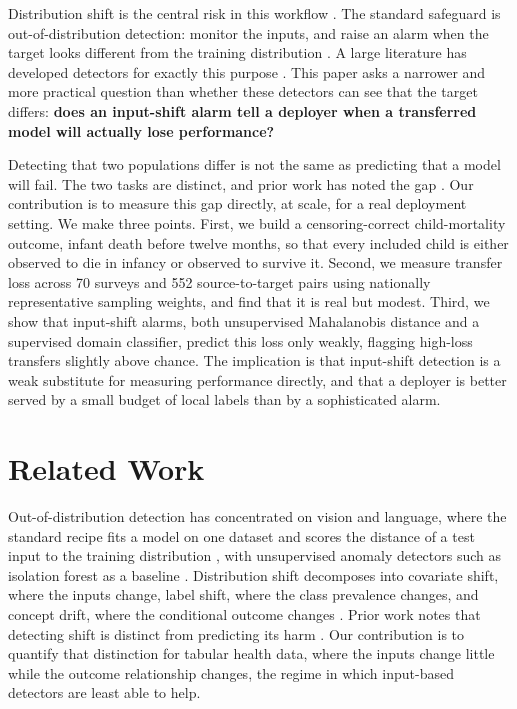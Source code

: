 \documentclass[letterpaper]{article} %
\begin{document}
Distribution shift is the central risk in this workflow \citep{quionero2009dataset, koh2021wilds}. The standard safeguard is out-of-distribution detection: monitor the inputs, and raise an alarm when the target looks different from the training distribution \citep{yang2021oodsurvey}. A large literature has developed detectors for exactly this purpose \citep{lee2018mahalanobis, liu2020energy, sun2022knn, liu2008isolation}. This paper asks a narrower and more practical question than whether these detectors can see that the target differs: \textbf{does an input-shift alarm tell a deployer when a transferred model will actually lose performance?}

Detecting that two populations differ is not the same as predicting that a model will fail. The two tasks are distinct, and prior work has noted the gap \citep{quionero2009dataset}. Our contribution is to measure this gap directly, at scale, for a real deployment setting. We make three points. First, we build a censoring-correct child-mortality outcome, infant death before twelve months, so that every included child is either observed to die in infancy or observed to survive it. Second, we measure transfer loss across 70 surveys and 552 source-to-target pairs using nationally representative sampling weights, and find that it is real but modest. Third, we show that input-shift alarms, both unsupervised Mahalanobis distance and a supervised domain classifier, predict this loss only weakly, flagging high-loss transfers slightly above chance. The implication is that input-shift detection is a weak substitute for measuring performance directly, and that a deployer is better served by a small budget of local labels than by a sophisticated alarm.

\section{Related Work}

Out-of-distribution detection has concentrated on vision and language, where the standard recipe fits a model on one dataset and scores the distance of a test input to the training distribution \citep{lee2018mahalanobis, liu2020energy, sun2022knn}, with unsupervised anomaly detectors such as isolation forest as a baseline \citep{liu2008isolation}. Distribution shift decomposes into covariate shift, where the inputs change, label shift, where the class prevalence changes, and concept drift, where the conditional outcome changes \citep{quionero2009dataset, gama2014concept}. Prior work notes that detecting shift is distinct from predicting its harm \citep{quionero2009dataset}. Our contribution is to quantify that distinction for tabular health data, where the inputs change little while the outcome relationship changes, the regime in which input-based detectors are least able to help.
\end{document}
